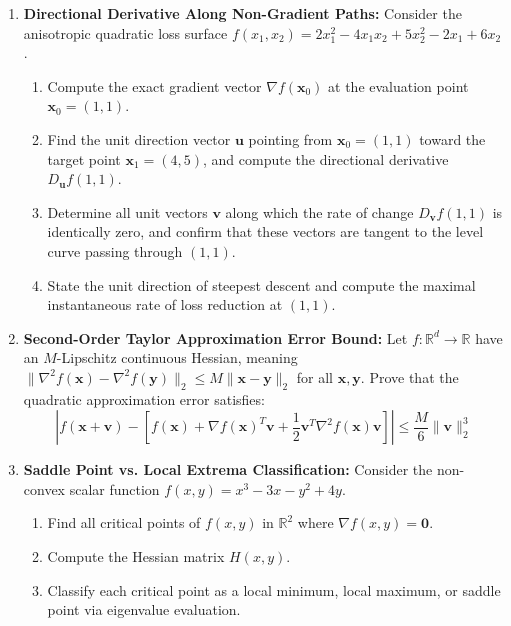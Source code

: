 \begin{enumerate}[label=\textbf{P\arabic*.}]
    \item \textbf{Directional Derivative Along Non-Gradient Paths:}
    Consider the anisotropic quadratic loss surface $f(x_1, x_2) = 2x_1^2 - 4x_1 x_2 + 5x_2^2 - 2x_1 + 6x_2$.
    \begin{enumerate}[label=(\alph*)]
        \item Compute the exact gradient vector $\nabla f(\mathbf{x}_0)$ at the evaluation point $\mathbf{x}_0 = (1, 1)$.
        \item Find the unit direction vector $\mathbf{u}$ pointing from $\mathbf{x}_0 = (1, 1)$ toward the target point $\mathbf{x}_1 = (4, 5)$, and compute the directional derivative $D_{\mathbf{u}} f(1, 1)$.
        \item Determine all unit vectors $\mathbf{v}$ along which the rate of change $D_{\mathbf{v}} f(1, 1)$ is identically zero, and confirm that these vectors are tangent to the level curve passing through $(1, 1)$.
        \item State the unit direction of steepest descent and compute the maximal instantaneous rate of loss reduction at $(1, 1)$.
    \end{enumerate}

    \item \textbf{Second-Order Taylor Approximation Error Bound:}
    Let $f: \mathbb{R}^d \to \mathbb{R}$ have an $M$-Lipschitz continuous Hessian, meaning $\|\nabla^2 f(\mathbf{x}) - \nabla^2 f(\mathbf{y})\|_2 \le M\|\mathbf{x} - \mathbf{y}\|_2$ for all $\mathbf{x}, \mathbf{y}$. Prove that the quadratic approximation error satisfies:
    \begin{equation}
    \left| f(\mathbf{x} + \mathbf{v}) - \left[ f(\mathbf{x}) + \nabla f(\mathbf{x})^T \mathbf{v} + \frac{1}{2}\mathbf{v}^T \nabla^2 f(\mathbf{x})\mathbf{v} \right] \right| \le \frac{M}{6}\|\mathbf{v}\|_2^3
    \end{equation}

    \item \textbf{Saddle Point vs. Local Extrema Classification:}
    Consider the non-convex scalar function $f(x, y) = x^3 - 3x - y^2 + 4y$.
    \begin{enumerate}[label=(\alph*)]
        \item Find all critical points of $f(x, y)$ in $\mathbb{R}^2$ where $\nabla f(x, y) = \mathbf{0}$.
        \item Compute the Hessian matrix $H(x, y)$.
        \item Classify each critical point as a local minimum, local maximum, or saddle point via eigenvalue evaluation.
    \end{enumerate}


\end{enumerate}
